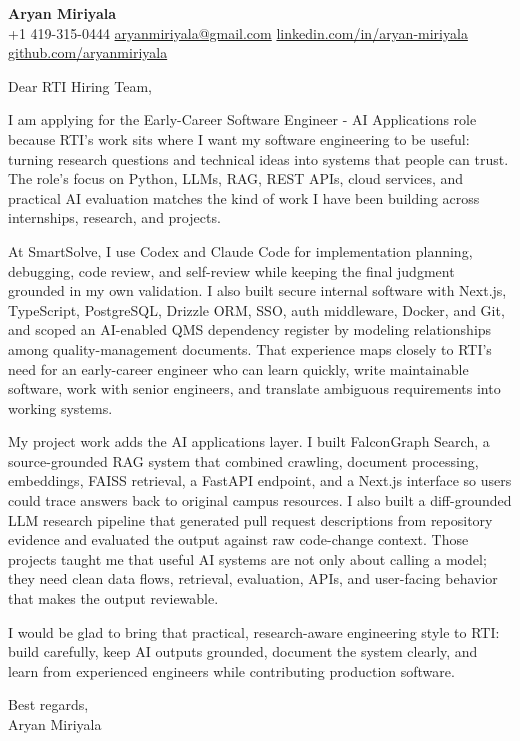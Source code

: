 \documentclass[letterpaper,11pt]{article}
\begin{document}
\begin{center}
    {\Large \textbf{Aryan Miriyala}}\\
    \vspace{2pt}
    +1 419-315-0444 \textbar{} \href{mailto:aryanmiriyala@gmail.com}{aryanmiriyala@gmail.com} \textbar{} \href{https://www.linkedin.com/in/aryan-miriyala-7788a21b6/}{linkedin.com/in/aryan-miriyala} \textbar{} \href{https://github.com/aryanmiriyala}{github.com/aryanmiriyala}
\end{center}

\vspace{10pt}

Dear RTI Hiring Team,

I am applying for the Early-Career Software Engineer - AI Applications role because RTI's work sits where I want my software engineering to be useful: turning research questions and technical ideas into systems that people can trust. The role's focus on Python, LLMs, RAG, REST APIs, cloud services, and practical AI evaluation matches the kind of work I have been building across internships, research, and projects.

At SmartSolve, I use Codex and Claude Code for implementation planning, debugging, code review, and self-review while keeping the final judgment grounded in my own validation. I also built secure internal software with Next.js, TypeScript, PostgreSQL, Drizzle ORM, SSO, auth middleware, Docker, and Git, and scoped an AI-enabled QMS dependency register by modeling relationships among quality-management documents. That experience maps closely to RTI's need for an early-career engineer who can learn quickly, write maintainable software, work with senior engineers, and translate ambiguous requirements into working systems.

My project work adds the AI applications layer. I built FalconGraph Search, a source-grounded RAG system that combined crawling, document processing, embeddings, FAISS retrieval, a FastAPI endpoint, and a Next.js interface so users could trace answers back to original campus resources. I also built a diff-grounded LLM research pipeline that generated pull request descriptions from repository evidence and evaluated the output against raw code-change context. Those projects taught me that useful AI systems are not only about calling a model; they need clean data flows, retrieval, evaluation, APIs, and user-facing behavior that makes the output reviewable.

I would be glad to bring that practical, research-aware engineering style to RTI: build carefully, keep AI outputs grounded, document the system clearly, and learn from experienced engineers while contributing production software.

\vspace{8pt}

Best regards,\\
Aryan Miriyala
\end{document}
